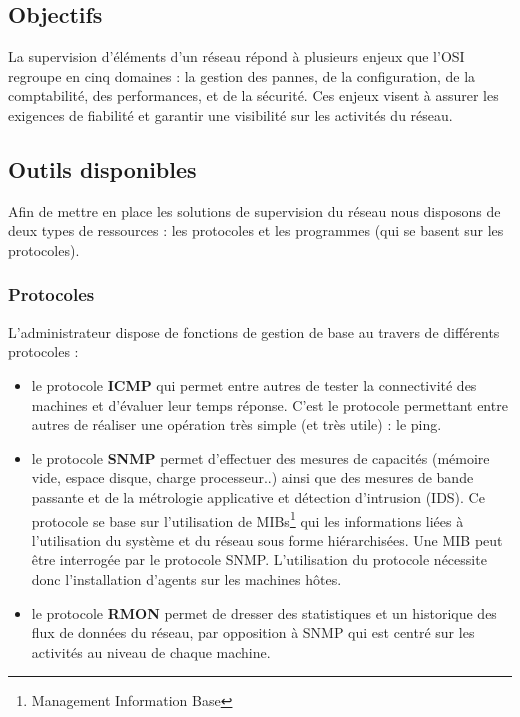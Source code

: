 \documentclass[a4paper]{article}
\begin{document}
\subsection{Objectifs}
La supervision d'éléments d'un réseau répond à plusieurs enjeux que l'OSI regroupe en cinq domaines : la gestion des pannes, de la configuration, de la comptabilité, des performances, et de la sécurité. Ces enjeux visent à assurer les exigences de fiabilité et garantir une visibilité sur les activités du réseau.  

\subsection{Outils disponibles}

Afin de mettre en place les solutions de supervision du réseau nous disposons de deux types de ressources : les protocoles et les programmes (qui se basent sur les protocoles).\\ 

\subsubsection{Protocoles}

L'administrateur dispose de fonctions de gestion de base au travers de différents protocoles :
\begin{itemize}
\item le protocole \textbf{ICMP} qui permet entre autres de tester la connectivité des machines et d'évaluer leur temps réponse. C'est le protocole permettant entre autres de réaliser une opération très simple (et très utile) : le ping. 
\item le protocole \textbf{SNMP} permet d'effectuer des mesures de capacités (mémoire vide, espace disque, charge processeur..) ainsi que des mesures de bande passante et de la métrologie applicative et détection d'intrusion (IDS). Ce protocole se base sur l'utilisation de MIBs\footnote{Management Information Base} qui les informations liées à l'utilisation du système et du réseau sous forme hiérarchisées. Une MIB peut être interrogée par le protocole SNMP. L'utilisation du protocole nécessite donc l'installation d'agents sur les machines hôtes.
\item le protocole \textbf{RMON} permet de dresser des statistiques et un historique des flux de données du réseau, par opposition à SNMP qui est centré sur les activités au niveau de chaque machine.
\end{itemize}
\end{document}
